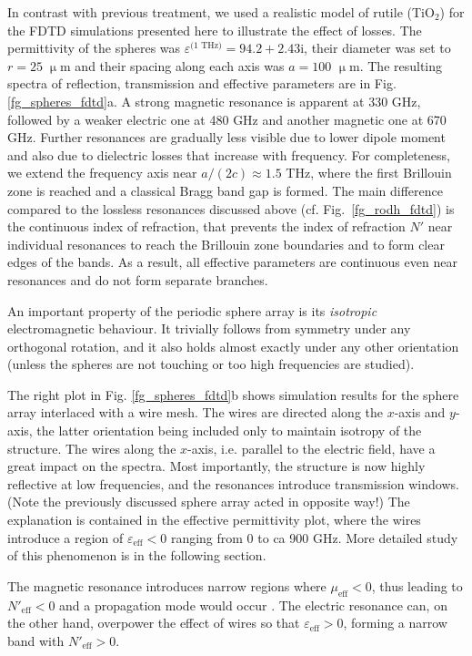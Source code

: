 {\begin{figure}[ht]
\end{figure}
In contrast with previous treatment, we used a realistic model \cite{baumard1977_epsilon_TiO2} of rutile (TiO$_{2}$) for the FDTD simulations presented here to illustrate the effect of losses. The permittivity of the spheres was $\varepsilon^{\text{(1 THz)}} = 94.2+2.43\text{i}$, their diameter was set to $r=25\;\upmu$m  and their spacing along each axis was $a =100$ $\upmu$m. The resulting spectra of reflection, transmission and effective parameters are in Fig. \ref{fg_spheres_fdtd}a. A strong magnetic resonance is apparent at 330 GHz, followed by a weaker electric one at 480 GHz and another magnetic one at 670 GHz. Further resonances are gradually less visible due to lower dipole moment and also due to dielectric losses that increase with frequency. 
For completeness, we extend the frequency axis near $a/(2c) \approx 1.5$ THz, where the first Brillouin zone is reached and a classical Bragg band gap is formed.
The main difference compared to the lossless resonances discussed above (cf. Fig.~\ref{fg_rodh_fdtd}) is the continuous index of refraction, that prevents the index of refraction $N'$ near individual resonances to reach the Brillouin zone boundaries and to form clear edges of the bands. As a result, all effective parameters are continuous even near resonances and do not form separate branches.

An important property of the periodic sphere array is its \textit{isotropic} electromagnetic behaviour. It trivially follows from symmetry under any orthogonal rotation, and it also holds almost exactly under any other orientation (unless the spheres are not touching or too high frequencies are studied).

The right plot in Fig. \ref{fg_spheres_fdtd}b shows simulation results for the sphere array interlaced with a wire mesh. The wires are directed along the $x$-axis and $y$-axis, the latter orientation being included only to maintain isotropy of the structure. The wires along the $x$-axis, i.e. parallel to the electric field, have a great impact on the spectra. Most importantly, the structure is now highly reflective at low frequencies, and the resonances introduce transmission windows. (Note the previously discussed sphere array acted in opposite way!) The explanation is contained in the effective permittivity plot, where the wires introduce a region of $\varepsilon_{\text{eff}} < 0$  ranging from 0 to ca 900 GHz. More detailed study of this phenomenon is in the following section.

The magnetic resonance introduces narrow regions where $\mu_{\text{eff}} < 0$, thus leading to $N'_{\text{eff}} < 0$ and a propagation mode would occur \cite{dominec2013resonant}. The electric resonance can, on the other hand, overpower the effect of wires so that $\varepsilon_{\text{eff}} > 0$, forming a narrow band with $N'_{\text{eff}} > 0$.

}
